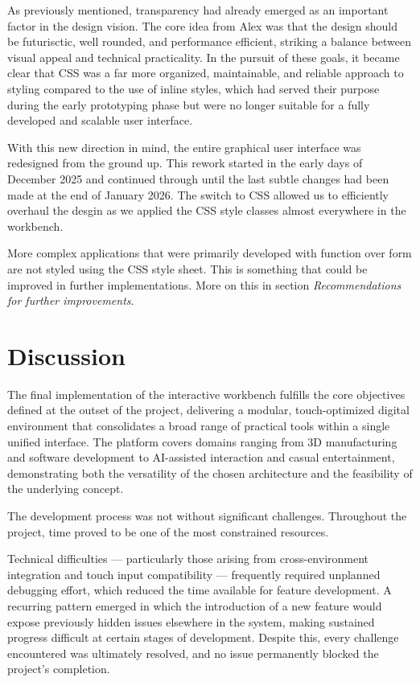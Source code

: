 \documentclass[a4paper,12pt]{article}
\begin{document}
As previously mentioned, transparency had already emerged as an important factor in the design vision. 
The core idea from Alex was that the design should be futurisctic, well rounded, and performance efficient, striking a balance between visual appeal and technical practicality. In the pursuit of these goals, it became clear that CSS was a far more organized, maintainable, and reliable approach to styling compared to the use of inline styles, which had served their purpose during the early prototyping phase but were no longer suitable for a fully developed and scalable user interface.

With this new direction in mind, the entire graphical user interface was redesigned from the ground up. 
This rework started in the early days of December 2025 and continued through until the last subtle changes had been made at the end of January 2026. 
The switch to CSS allowed us to efficiently overhaul the desgin as we applied the CSS style classes almost everywhere in the workbench. 

\begin{notebox}
More complex applications that were primarily developed with function over form are not styled using the CSS style sheet. 
This is something that could be improved in further implementations. 
More on this in section \textit{Recommendations for further improvements}. 
\end{notebox}


\newpage
\section{Discussion}
The final implementation of the interactive workbench fulfills the core objectives defined at the outset of the project, delivering a modular, touch-optimized digital environment that consolidates a broad range of practical tools within a single unified interface. The platform covers domains ranging from 3D manufacturing and software development to AI-assisted interaction and casual entertainment, demonstrating both the versatility of the chosen architecture and the feasibility of the underlying concept.

The development process was not without significant challenges. 
Throughout the project, time proved to be one of the most constrained resources. 

Technical difficulties — particularly those arising from cross-environment integration and touch input compatibility — frequently required unplanned debugging effort, which reduced the time available for feature development. 
A recurring pattern emerged in which the introduction of a new feature would expose previously hidden issues elsewhere in the system, making sustained progress difficult at certain stages of development. 
Despite this, every challenge encountered was ultimately resolved, and no issue permanently blocked the project's completion.
\end{document}
